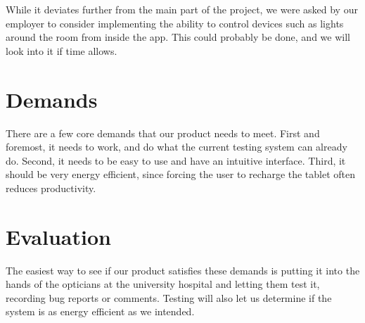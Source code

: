 \documentclass[12pt,a4paper,notitlepage]{report}
\begin{document}
While it deviates further from the main part of the project, we were asked by our employer to consider implementing the ability to control devices such as lights around the room from inside the app. This could probably be done, and we will look into it if time allows.

\section{Demands}

There are a few core demands that our product needs to meet. First and foremost, it needs to work, and do what the current testing system can already do. Second, it needs to be easy to use and have an intuitive interface. Third, it should be very energy efficient, since forcing the user to recharge the tablet often reduces productivity. 

\section{Evaluation}

The easiest way to see if our product satisfies these demands is putting it into the hands of the opticians at the university hospital and letting them test it, recording bug reports or comments. Testing will also let us determine if the system is as energy efficient as we intended.

\cite{Exempel1}



\end{document}
